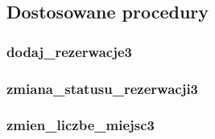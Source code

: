 \documentclass[12pt]{article}
\begin{document}
\subsection{Dostosowane procedury}

\subsubsection{dodaj\_rezerwacje3}


\subsubsection{zmiana\_statusu\_rezerwacji3}


\subsubsection{zmien\_liczbe\_miejsc3}

\end{document}
